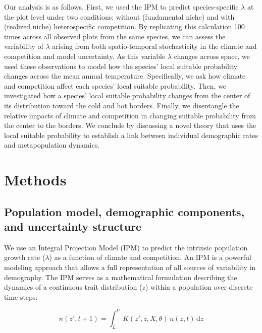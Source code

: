 \documentclass[12pt]{article}
\begin{document}
Our analysis is as follows. First, we used the IPM to predict
species-specific \(\lambda\) at the plot level under two conditions:
without (fundamental niche) and with (realized niche) heterospecific
competition. By replicating this calculation 100 times across all
observed plots from the same species, we can assess the variability of
\(\lambda\) arising from both spatio-temporal stochasticity in the
climate and competition and model uncertainty. As this variable
\(\lambda\) changes across space, we used these observations to model
how the species' local suitable probability changes across the mean
annual temperature. Specifically, we ask how climate and competition
affect each species' local suitable probability. Then, we investigated
how a species' local suitable probability changes from the center of its
distribution toward the cold and hot borders. Finally, we disentangle
the relative impacts of climate and competition in changing suitable
probability from the center to the borders. We conclude by discussing a
novel theory that uses the local suitable probability to establish a
link between individual demographic rates and metapopulation dynamics.

\hypertarget{methods}{%
\section{Methods}\label{methods}}

\hypertarget{population-model-demographic-components-and-uncertainty-structure}{%
\subsection{Population model, demographic components, and uncertainty
structure}\label{population-model-demographic-components-and-uncertainty-structure}}

We use an Integral Projection Model (IPM) to predict the intrinsic
population growth rate (\(\lambda\)) as a function of climate and
competition. An IPM is a powerful modeling approach that allows a full
representation of all sources of variability in demography. The IPM
serves as a mathematical formulation describing the dynamics of a
continuous trait distribution (\(z\)) within a population over discrete
time steps:

\begin{equation}
n(z', t + 1) = \int_{L}^{U} \, K(z', z, X, \theta)\, n(z, t)\, \mathrm{d}z
\label{eq:ipm}\end{equation}
\end{document}

